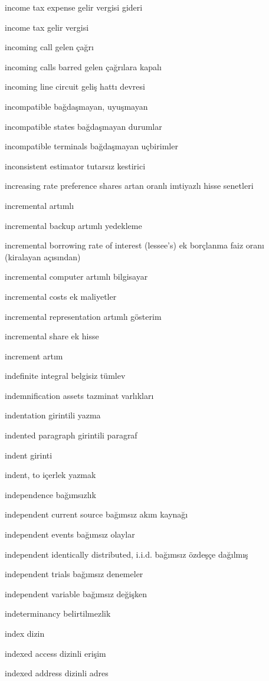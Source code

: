 \documentclass[12pt,fleqn]{article}\usepackage{../../common}
\begin{document}
income tax expense gelir vergisi gideri

income tax gelir vergisi

incoming call gelen çağrı

incoming calls barred gelen çağrılara kapalı

incoming line circuit geliş hattı devresi

incompatible bağdaşmayan, uyuşmayan

incompatible states bağdaşmayan durumlar

incompatible terminals bağdaşmayan uçbirimler

inconsistent estimator tutarsız kestirici

increasing rate preference shares artan oranlı imtiyazlı hisse senetleri

incremental artımlı

incremental backup artımlı yedekleme

incremental borrowing rate of interest (lessee's) ek borçlanma faiz oranı (kiralayan açısından)

incremental computer artımlı bilgisayar

incremental costs ek maliyetler

incremental representation artımlı gösterim

incremental share ek hisse

increment artım

indefinite integral belgisiz tümlev

indemnification assets tazminat varlıkları

indentation girintili yazma

indented paragraph girintili paragraf

indent girinti

indent, to içerlek yazmak

independence bağımsızlık

independent current source bağımsız akım kaynağı

independent events bağımsız olaylar

independent identically distributed, i.i.d. bağımsız özdeşçe dağılmış

independent trials bağımsız denemeler

independent variable bağımsız değişken

indeterminancy belirtilmezlik

index dizin

indexed access dizinli erişim

indexed address dizinli adres
\end{document}
